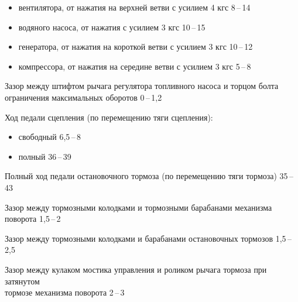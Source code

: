 \documentclass[12pt,a4paper,twoside,openright]{book}
\newcommand{\range}[2]{#1\,--\,#2}
\begin{document}
\begin{itemize}
    \item вентилятора, от нажатия на верхней ветви с усилием 4 кгс \dotfill \hspace*{1em} \range{8}{14}

    \item водяного насоса, от нажатия с усилием 3 кгс \dotfill \hspace*{1em} \range{10}{15}

    \item генератора, от нажатия на короткой ветви с усилием 3 кгс \dotfill \hspace*{1em} \range{10}{12}

    \item компрессора, от нажатия на середине ветви с усилием 3 кгс \dotfill \hspace*{1em} \range{5}{8}
\end{itemize}

\noindent
Зазор между штифтом рычага регулятора топливного насоса и торцом болта\\ограничения максимальных оборотов \dotfill \hspace*{1em} \range{0}{1,2}

\noindent
Ход педали сцепления (по перемещению тяги сцепления): 	
\begin{itemize}
    \item свободный \dotfill \hspace*{1em} \range{6,5}{8} 
    \item полный \dotfill \hspace*{1em} \range{36}{39} 
\end{itemize} 

\noindent
Полный ход педали остановочного тормоза (по перемещению тяги тормоза) \dotfill \hspace*{1em} \range{35}{43}

\noindent
Зазор между тормозными  колодками и тормозными барабанами механизма\\поворота \dotfill \hspace*{1em} \range{1,5}{2} 


\noindent
Зазор между тормозными колодками и барабанами остановочных тормозов \dotfill \hspace*{1em} \range{1,5}{2,5}


\noindent
Зазор между кулаком мостика управления и роликом рычага тормоза при затянутом\\тормозе механизма поворота \dotfill \hspace*{1em} \range{2}{3}
\end{document}
